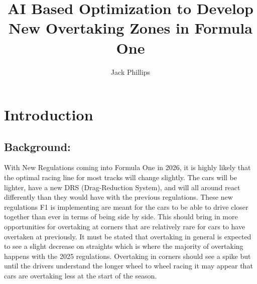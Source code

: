\documentclass[11pt]{article} %
\title{AI Based Optimization to Develop New Overtaking Zones in Formula One}
\author{Jack Phillips}
\begin{document}
\maketitle

\section{Introduction}

\subsection {Background:} With New Regulations coming into Formula One in 2026, it is highly likely that the optimal racing line for most tracks will change slightly. The cars will be lighter, have a new DRS (Drag-Reduction System), and will all around react differently than they would have with the previous regulations. These new regulations F1 is implementing are meant for the cars to be able to drive closer together than ever in terms of being side by side. This should bring in more opportunities for overtaking at corners that are relatively rare for cars to have overtaken at previously. It must be stated that overtaking in general is expected to see a slight decrease on straights which is where the majority of overtaking happens with the 2025 regulations. Overtaking in corners should see a spike but until the drivers understand the longer wheel to wheel racing it may appear that cars are overtaking less at the start of the season.
\end{document}
